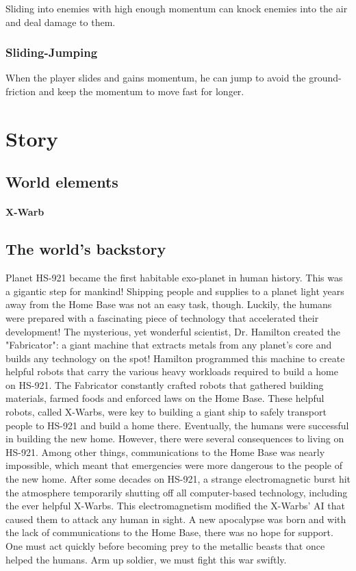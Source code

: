 \documentclass[12pt]{article}
\begin{document}
Sliding into enemies with high enough momentum can knock enemies into the air and deal damage to them. 

\subsubsection{Sliding-Jumping}

When the player slides and gains momentum, he can jump to avoid the ground-friction and keep the momentum to move fast for longer.


\section{Story}

\subsection{World elements}

\paragraph{X-Warb} 


\subsection{The world's backstory}

Planet HS-921 became the first habitable exo-planet in human history. This was a gigantic step for mankind! Shipping people and supplies to a planet light years away from the Home Base was not an easy task, though. Luckily, the humans were prepared with a fascinating piece of technology that accelerated their development! The mysterious, yet wonderful scientist, Dr. Hamilton created the "Fabricator": a giant machine that extracts metals from any planet's core and builds any technology on the spot! Hamilton programmed this machine to create helpful robots that carry the various heavy workloads required to build a home on HS-921. The Fabricator constantly crafted robots that gathered building materials, farmed foods and enforced laws on the Home Base. These helpful robots, called X-Warbs, were key to building a giant ship to safely transport people to HS-921 and build a home there. Eventually, the humans were successful in building the new home. However, there were several consequences to living on HS-921. Among other things, communications to the Home Base was nearly impossible, which meant that emergencies were more dangerous to the people of the new home. After some decades on HS-921, a strange electromagnetic burst hit the atmosphere temporarily shutting off all computer-based technology, including the ever helpful X-Warbs. This electromagnetism modified the X-Warbs' AI that caused them to attack any human in sight. A new apocalypse was born and with the lack of communications to the Home Base, there was no hope for support. One must act quickly before becoming prey to the metallic beasts that once helped the humans. Arm up soldier, we must fight this war swiftly. 
\end{document}
